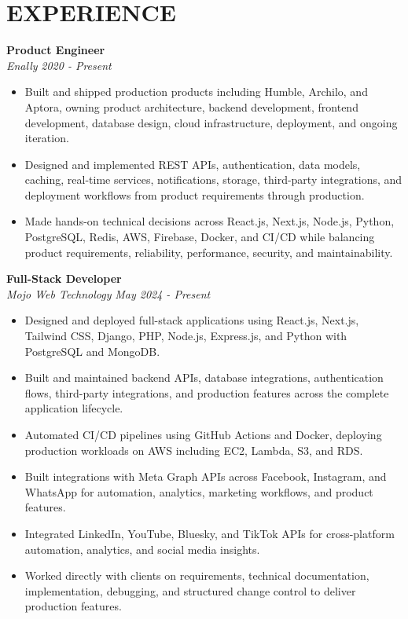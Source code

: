 \documentclass[a4paper,11pt]{article}
\begin{document}
\section*{EXPERIENCE}
\textbf{Product Engineer} \\
\textit{Enally} \hfill \textit{2020 - Present}
\begin{itemize}
    \item Built and shipped production products including Humble, Archilo, and Aptora, owning product architecture, backend development, frontend development, database design, cloud infrastructure, deployment, and ongoing iteration.
    \item Designed and implemented REST APIs, authentication, data models, caching, real-time services, notifications, storage, third-party integrations, and deployment workflows from product requirements through production.
    \item Made hands-on technical decisions across React.js, Next.js, Node.js, Python, PostgreSQL, Redis, AWS, Firebase, Docker, and CI/CD while balancing product requirements, reliability, performance, security, and maintainability.
\end{itemize}
\vspace{5pt}
\textbf{Full-Stack Developer} \\
\textit{Mojo Web Technology} \hfill \textit{May 2024 - Present}
\begin{itemize}
    \item Designed and deployed full-stack applications using React.js, Next.js, Tailwind CSS, Django, PHP, Node.js, Express.js, and Python with PostgreSQL and MongoDB.
    \item Built and maintained backend APIs, database integrations, authentication flows, third-party integrations, and production features across the complete application lifecycle.
    \item Automated CI/CD pipelines using GitHub Actions and Docker, deploying production workloads on AWS including EC2, Lambda, S3, and RDS.
    \item Built integrations with Meta Graph APIs across Facebook, Instagram, and WhatsApp for automation, analytics, marketing workflows, and product features.
    \item Integrated LinkedIn, YouTube, Bluesky, and TikTok APIs for cross-platform automation, analytics, and social media insights.
    \item Worked directly with clients on requirements, technical documentation, implementation, debugging, and structured change control to deliver production features.
\end{itemize}
\end{document}
